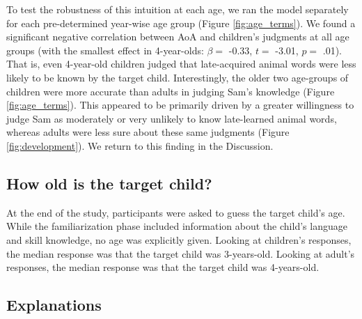 \documentclass[10pt, letterpaper]{article}
\begin{document}
To test the robustness of this intuition at each age, we ran the model
separately for each pre-determined year-wise age group (Figure
\ref{fig:age_terms}). We found a significant negative correlation
between AoA and children's judgments at all age groups (with the
smallest effect in 4-year-olds: \(\beta =\) -0.33, \(t =\) -3.01,
\(p =\) .01). That is, even 4-year-old children judged that
late-acquired animal words were less likely to be known by the target
child. Interestingly, the older two age-groups of children were more
accurate than adults in judging Sam's knowledge (Figure
\ref{fig:age_terms}). This appeared to be primarily driven by a greater
willingness to judge Sam as moderately or very unlikely to know
late-learned animal words, whereas adults were less sure about these
same judgments (Figure \ref{fig:development}). We return to this finding
in the Discussion.

\hypertarget{how-old-is-the-target-child}{%
\subsection{How old is the target
child?}\label{how-old-is-the-target-child}}

At the end of the study, participants were asked to guess the target
child's age. While the familiarization phase included information about
the child's language and skill knowledge, no age was explicitly given.
Looking at children's responses, the median response was that the target
child was 3-years-old. Looking at adult's responses, the median response
was that the target child was 4-years-old.

\hypertarget{explanations}{%
\subsection{Explanations}\label{explanations}}
\end{document}
